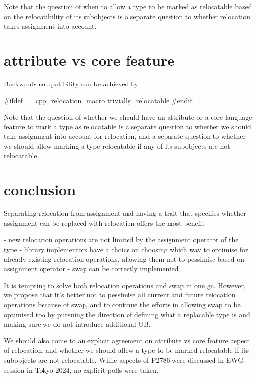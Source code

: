 \documentclass{wg21}
\begin{document}
Note that the question of when to allow a type to be marked as relocatable based on the relocatibility of its subobjects is a separate question to whether relocation takes assignment into account.

\section{attribute vs core feature}

Backwards compatibility can be achieved by

\begin{colorblock}
#ifdef __cpp_relocation_macro
trivially_relocatable
#endif
\end{colorblock}



Note that the question of whether we should have an attribute or a core language feature to mark a type as relocatable is a separate question to whether we should take assignment into account for relocation, and a separate question to whether we should allow marking a type relocatable if any of its subobjects are not relocatable.

\section{conclusion}

Separating relocation from assignment and having a trait that specifies whether assignment can be replaced with relocation offers the most benefit

- new relocation operations are not limited by the assignment operator of the type
- library implementors have a choice on choosing which way to optimise for already existing relocation operations, allowing them not to pessimise based on assignment operator
- swap can be correctly implemented

It is tempting to solve both relocation operations and swap in one go. However, we propose that it's better not to pessimise all current and future relocation operations because of swap, and to continue the efforts in allowing swap to be optimised too by pursuing the direction of defining what a replacable type is and making sure we do not introduce additional UB.

We should also come to an explicit agreement on attribute vs core feature aspect of relocation, and whether we should allow a type to be marked relocatable if its subobjects are not relocatable. While aspects of P2786 were discussed in EWG session in Tokyo 2024, no explicit polls were taken.

\appendix





\renewcommand{\section}[2]{}%

\begin{thebibliography}{9}

\end{thebibliography}
\end{document}
